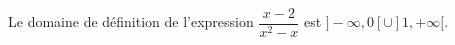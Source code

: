 Le domaine de définition de l'expression $\dfrac{x-2}{x^2-x}$ est $]-\infty,0[\cup ]1,+\infty[$.

\begin{reponses}
\end{reponses}

